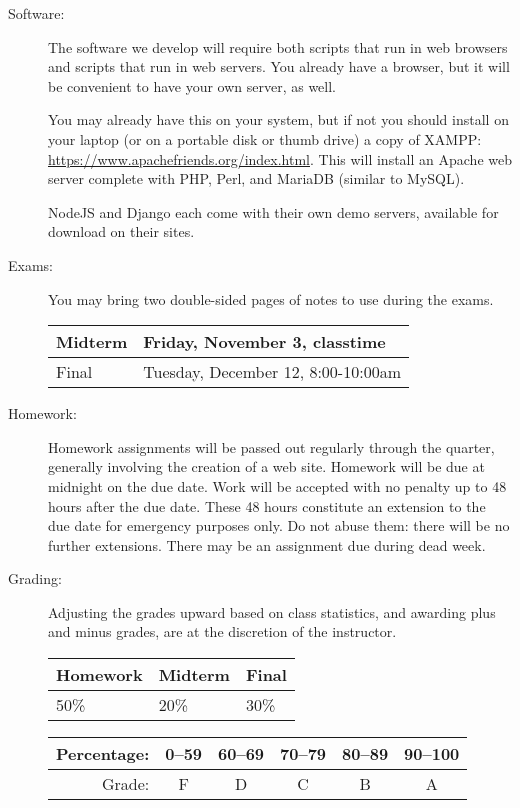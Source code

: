 \documentclass{article}
\begin{document}
\begin{description}
  
\item[Software:] The software we develop will require both
  scripts that run in web browsers and scripts that run in web
  servers.  You already have a browser, but it will be convenient to
  have your own server, as well.

  You may already have this on your system, but if not you should
  install on your laptop (or on a portable disk or thumb drive) a copy
  of XAMPP: \url{https://www.apachefriends.org/index.html}.  This will
  install an Apache web server complete with PHP, Perl, and MariaDB
  (similar to MySQL).

  NodeJS and Django each come with their own demo servers, available
  for download on their sites.

\item[Exams:]   You may bring two
  double-sided pages of notes to use during the exams.

  \begin{tabular}{|l|l|}\hline
    Midterm &  Friday, November 3, classtime  \\\hline
Final   & Tuesday, December 12, 8:00-10:00am \\\hline
    \end{tabular}

\item[Homework:] Homework assignments will be passed out regularly
  through the quarter, generally involving the creation of a web site.
  Homework will be due at midnight on the due date.  Work will be
  accepted with no penalty up to 48 hours after the due date.  These
  48 hours constitute an extension to the due date for emergency
  purposes only.  Do not abuse them: there will be no further
  extensions.  There may be an assignment due during dead week.

\item[Grading:]  Adjusting the grades upward based on class
  statistics, and awarding plus and minus grades, are at the
  discretion of the instructor.

\begin{tabular}{|l|l|l|}\hline
Homework  & Midterm & Final\\\hline
50\% & 20\% & 30\%\\\hline
\end{tabular}\hfill
  \begin{tabular}{|r|c|c|c|c|c|}\hline
    Percentage: & 0--59 & 60--69 & 70--79 & 80--89 & 90--100\\\hline
    Grade: & F & D & C & B & A \\\hline
    \end{tabular}


\end{description}
\end{document}
